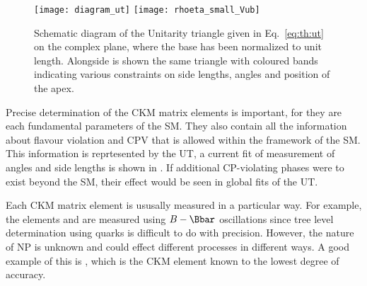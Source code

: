 \begin{figure}
  \begin{center}
      \texttt{[image: diagram\_ut]}
      \texttt{[image: rhoeta\_small\_Vub]}
  \end{center}
  \caption[Unitarity triangle]{\small
    Schematic diagram of the Unitarity triangle given in Eq.~\ref{eq:th:ut} on the complex plane,
    where the base has been normalized to unit length.
    Alongside is shown the same triangle with coloured bands indicating various constraints on
    side lengths, angles and position of the apex.
  }
  \label{fig:th:ut}
\end{figure}

Precise determination of the CKM matrix elements is important, for  they are each fundamental
parameters of the SM.
They also contain all the information about flavour violation and CPV that is allowed within the
framework of the SM.
This information is reprtesented by the UT, a current fit of measurement of angles and side lengths
is shown in .
If additional CP-violating phases were to exist beyond the SM, their effect would be seen in global
fits of the UT.


Each CKM matrix element is ususally measured in a particular way.
For example, the elements  and  are measured using $B-\Bbar$ oscillations since tree
level determination using \tquark quarks is difficult to do with precision.
However, the nature of NP is unknown and could effect different processes in different ways.
A good example of this is , which is the CKM element known to the lowest degree of accuracy.





